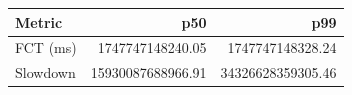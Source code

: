\begin{tabular}{lrr}
\toprule
Metric & p50 & p99 \\
\midrule
FCT (ms) & 1747747148240.05 & 1747747148328.24 \\
Slowdown & 15930087688966.91 & 34326628359305.46 \\
\bottomrule
\end{tabular}
